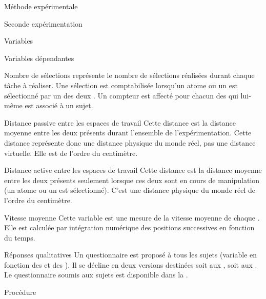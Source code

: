 \documentclass[myfrancais]{mythesis}
\begin{document}
\begin{mychapter}{Méthode expérimentale}
\begin{mysection}{Seconde expérimentation}
\begin{mysubsection}{Variables}
\begin{mysubsubsection}{Variables dépendantes}
\begin{myparagraph}{ Nombre de sélections}
						 représente le nombre de sélections réalisées durant chaque tâche à réaliser.
						Une sélection est comptabilisée lorsqu'un atome ou un  est sélectionné par un des deux .
						Un compteur est affecté pour chacun des  qui lui-même est associé à un sujet.
					\end{myparagraph}
					\begin{myparagraph}{ Distance passive entre les espaces de travail}
						Cette distance est la distance moyenne entre les deux  présents durant l'ensemble de l'expérimentation.
						Cette distance représente donc une distance physique du monde réel, pas une distance virtuelle.
						Elle est de l'ordre du centimètre.
					\end{myparagraph}
					\begin{myparagraph}{ Distance active entre les espaces de travail}
						Cette distance est la distance moyenne entre les deux  présents seulement lorsque ces deux  sont en cours de manipulation (un atome ou un  est sélectionné).
						C'est une distance physique du monde réel de l'ordre du centimètre.
					\end{myparagraph}
					\begin{myparagraph}{ Vitesse moyenne}
						Cette variable est une mesure de la vitesse moyenne de chaque .
						Elle est calculée par intégration numérique des positions successives en fonction du temps.
					\end{myparagraph}
					\begin{myparagraph}{ Réponses qualitatives}
						Un questionnaire est proposé à tous les sujets (variable en fonction des  et des ).
						Il se décline en deux versions destinées soit aux , soit aux .
						Le questionnaire soumis aux sujets est disponible dans la .
					\end{myparagraph}
				\end{mysubsubsection}
			\end{mysubsection}
			\begin{mysubsection}{Procédure}

\end{mysubsection}
\end{mysection}
\end{mychapter}
\end{document}
